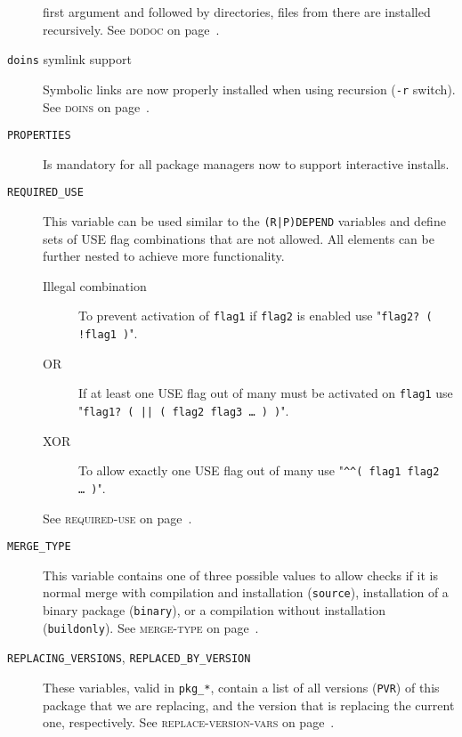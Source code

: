 \documentclass[a4paper,nofoldmark]{leaflet}
\newcommand{\code}[1]{\texttt{#1}}
\newcommand{\featureref}[1]{\textsc{#1} on page~\pageref{feat:#1}}
\begin{document}
\begin{description}
    first argument and followed by directories, files from there are
    installed recursively.  See \featureref{dodoc}.
    \item[\code{doins} symlink support] Symbolic links are now
    properly installed when using recursion (\code{-r} switch).
    See \featureref{doins}.
    \item[\code{PROPERTIES}] Is mandatory for all package managers now
    to support interactive installs.
    \item[\code{REQUIRED_USE}] This variable can be used similar to
    the \code{(R|P)DEPEND} variables and define sets of USE flag
    combinations that are not allowed.  All elements can be further
    nested to achieve more functionality.
    \begin{description}
        \item[Illegal combination] To prevent activation of
        \code{flag1} if \code{flag2} is enabled use
        "\code{flag2?\ ( !flag1 )}".
        \item[OR] If at least one USE flag out of many must be
        activated on \code{flag1} use
        "\code{flag1?\ ( || ( flag2 flag3 \dots\ ) )}".
        \item[XOR] To allow exactly one USE flag out of many use
        "\code{\textasciicircum\textasciicircum ( flag1 flag2 \dots\ )}".
    \end{description}
    See \featureref{required-use}.
    \item[\code{MERGE_TYPE}] This variable contains one of three
    possible values to allow checks if it is normal merge with
    compilation and installation (\code{source}), installation of a
    binary package (\code{binary}), or a compilation without
    installation (\code{buildonly}).  See \featureref{merge-type}.
    \item[\code{REPLACING_VERSIONS}, \code{REPLACED_BY_VERSION}]
    These variables, valid in \code{pkg_*}, contain a list of all
    versions (\code{PVR}) of this package that we are replacing, and
    the version that is replacing the current one, respectively.
    See \featureref{replace-version-vars}.
\end{description}
\end{document}
